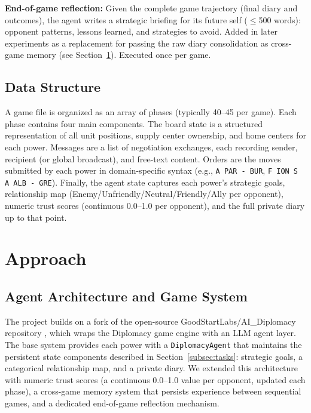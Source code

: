 \documentclass[a4paper,oneside,bibliography=totoc]{scrartcl}
\begin{document}
\medskip
\noindent\begin{minipage}{\linewidth}
\textbf{End-of-game reflection:}
Given the complete game trajectory (final diary and outcomes), the agent writes a strategic briefing for its future self ($\leq$500 words): opponent patterns, lessons learned, and strategies to avoid. Added in later experiments as a replacement for passing the raw diary consolidation as cross-game memory (see Section~\ref{sec:approach}). Executed once per game.
\end{minipage}

\subsection{Data Structure}

A game file is organized as an array of phases (typically 40--45 per game). Each phase contains four main components. The board state is a structured representation of all unit positions, supply center ownership, and home centers for each power. Messages are a list of negotiation exchanges, each recording sender, recipient (or global broadcast), and free-text content. Orders are the moves submitted by each power in domain-specific syntax (e.g., \texttt{A PAR - BUR}, \texttt{F ION S A ALB - GRE}). Finally, the agent state captures each power's strategic goals, relationship map (Enemy/Unfriendly/Neutral/Friendly/Ally per opponent), numeric trust scores (continuous 0.0--1.0 per opponent), and the full private diary up to that point.

\section{Approach}
\label{sec:approach}

\subsection{Agent Architecture and Game System}

The project builds on a fork of the open-source GoodStartLabs/AI\_Diplomacy repository \cite{goodstartlabs2025}, which wraps the Diplomacy game engine with an LLM agent layer. The base system provides each power with a \texttt{DiplomacyAgent} that maintains the persistent state components described in Section~\ref{subsec:tasks}: strategic goals, a categorical relationship map, and a private diary. We extended this architecture with numeric trust scores (a continuous 0.0--1.0 value per opponent, updated each phase), a cross-game memory system that persists experience between sequential games, and a dedicated end-of-game reflection mechanism.
\end{document}
